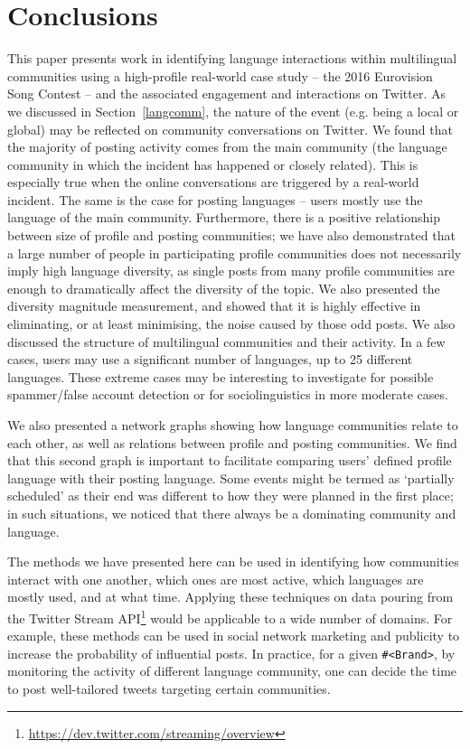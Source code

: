 \documentclass{llncs}
\begin{document}
{\section{Conclusions}\label{conclusions}

This paper presents work in identifying language interactions within
multilingual communities using a high-profile real-world case study --
the 2016 Eurovision Song Contest -- and the associated engagement and
interactions on Twitter. As we discussed in Section~\ref{langcomm},
the nature of the event (e.g. being a local or global) may be
reflected on community conversations on Twitter. We found that the
majority of posting activity comes from the main community (the
language community in which the incident has happened or closely
related). This is especially true when the online conversations are
triggered by a real-world incident. The same is the case for posting
languages -- users mostly use the language of the main
community. Furthermore, there is a positive relationship between size
of profile and posting communities; we have also demonstrated that a
large number of people in participating profile communities does not
necessarily imply high language diversity, as single posts from many
profile communities are enough to dramatically affect the diversity of
the topic. We also presented the diversity magnitude measurement, and
showed that it is highly effective in eliminating, or at least
minimising, the noise caused by those odd posts.  We also discussed
the structure of multilingual communities and their activity.  In a
few cases, users may use a significant number of languages, up to 25
different languages. These extreme cases may be interesting to
investigate for possible spammer/false account detection or for
sociolinguistics in more moderate cases.

We also presented a network graphs showing how language communities
relate to each other, as well as relations between profile and posting
communities. We find that this second graph is important to facilitate
comparing users' defined profile language with their posting
language. Some events might be termed as `partially scheduled' as
their end was different to how they were planned in the first place;
in such situations, we noticed that there always be a dominating
community and language.

The methods we have presented here can be used in identifying how
communities interact with one another, which ones are most active,
which languages are mostly used, and at what time. Applying these
techniques on data pouring from the Twitter Stream
API\footnote{\url{https://dev.twitter.com/streaming/overview}} would
be applicable to a wide number of domains. For example, these methods
can be used in social network marketing and publicity to increase the
probability of influential posts. In practice, for a given
{\texttt{\#<Brand>}}, by monitoring the activity of different language
community, one can decide the time to post well-tailored tweets
targeting certain communities.

}
\end{document}
